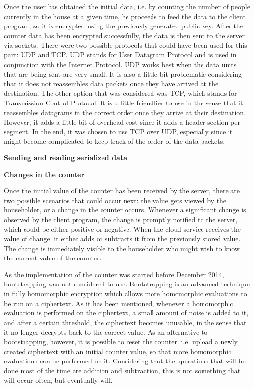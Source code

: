 Once the user has obtained the initial data, i.e. by counting the number of people currently in the house at a given time, he proceeds to feed the data to the client program, so it is encrypted using the previously generated public key. After the counter data has been encrypted successfully, the data is then sent to the server via sockets. There were two possible protocols that could have been used for this part: UDP and TCP. UDP stands for User Datagram Protocol and is used in conjunction with the Internet Protocol. UDP works best when the data units that are being sent are very small. It is also a little bit problematic considering that it does not reassembles data packets once they have arrived at the destination. The other option that was considered was TCP, which stands for Transmission Control Protocol. It is a little friendlier to use in the sense that it reassembles datagrams in the correct order once they arrive at their destination. However, it adds a little bit of overhead cost since it adds a header section per segment. In the end, it was chosen to use TCP over UDP, especially since it might become complicated to keep track of the order of the data packets.

\textbf{Sending and reading serialized data}

\textbf{Changes in the counter}

Once the initial value of the counter has been received by the server, there are two possible scenarios that could occur next: the value gets viewed by the householder, or a change in the counter occurs. Whenever a significant change is observed by the client program, the change is promptly notified to the server, which could be either positive or negative. When the cloud service receives the value of change, it either adds or subtracts it from the previously stored value. The change is immediately visible to the householder who might wish to know the current value of the counter.

As the implementation of the counter was started before December 2014, bootstrapping was not considered to use. Bootstrapping is an advanced technique in fully homomorphic encryption which allows more homomorphic evaluations to be run on a ciphertext. As it has been mentioned, whenever a homomorphic evaluation is performed on the ciphertext, a small amount of noise is added to it, and after a certain threshold, the ciphertext becomes unusable, in the sense that it no longer decrypts back to the correct value. As an alternative to bootstrapping, however, it is possible to reset the counter, i.e. upload a newly created ciphertext with an initial counter value, so that more homomorphic evaluations can be performed on it. Considering that the operations that will be done most of the time are addition and subtraction, this is not something that will occur often, but eventually will. 

